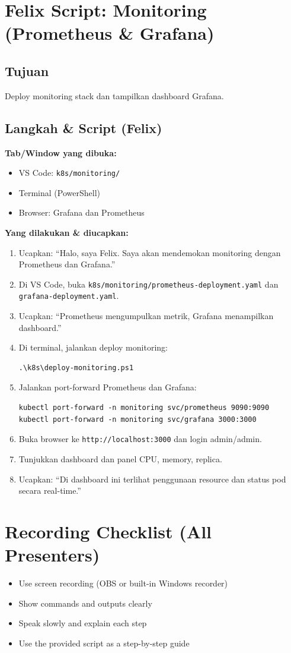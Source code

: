 \documentclass[11pt,a4paper]{article}
\begin{document}
\section{Felix Script: Monitoring (Prometheus \& Grafana)}
\subsection*{Tujuan}
Deploy monitoring stack dan tampilkan dashboard Grafana.

\subsection*{Langkah \& Script (Felix)}
\textbf{Tab/Window yang dibuka:}
\begin{itemize}
  \item VS Code: \texttt{k8s/monitoring/}
  \item Terminal (PowerShell)
  \item Browser: Grafana dan Prometheus
\end{itemize}

\textbf{Yang dilakukan \& diucapkan:}
\begin{enumerate}
  \item Ucapkan:
  “Halo, saya Felix. Saya akan mendemokan monitoring dengan Prometheus dan Grafana.”

  \item Di VS Code, buka \texttt{k8s/monitoring/prometheus-deployment.yaml} dan \texttt{grafana-deployment.yaml}.
  \item Ucapkan:
  “Prometheus mengumpulkan metrik, Grafana menampilkan dashboard.”

  \item Di terminal, jalankan deploy monitoring:
\begin{lstlisting}
.\k8s\deploy-monitoring.ps1
\end{lstlisting}

  \item Jalankan port-forward Prometheus dan Grafana:
\begin{lstlisting}
kubectl port-forward -n monitoring svc/prometheus 9090:9090
kubectl port-forward -n monitoring svc/grafana 3000:3000
\end{lstlisting}

  \item Buka browser ke \texttt{http://localhost:3000} dan login admin/admin.
  \item Tunjukkan dashboard dan panel CPU, memory, replica.
  \item Ucapkan:
  “Di dashboard ini terlihat penggunaan resource dan status pod secara real-time.”
\end{enumerate}

\section{Recording Checklist (All Presenters)}
\begin{itemize}
  \item Use screen recording (OBS or built-in Windows recorder)
  \item Show commands and outputs clearly
  \item Speak slowly and explain each step
  \item Use the provided script as a step-by-step guide
\end{itemize}
\end{document}
